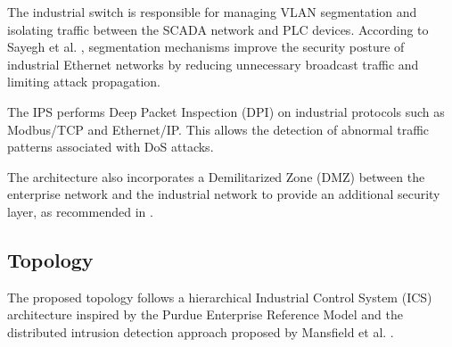 \documentclass[sigconf]{acmart}
\begin{document}
\begin{table}[htbp]
\renewcommand{\tablename}{Table} 
\renewcommand{\thetable}{\arabic{table}}
\captionsetup{labelsep=period, labelfont=bf, textfont=normal, textformat=simple} 
\caption{Components of the Proposed Industrial Architecture} 
\centering
\scriptsize
{}
\end{table}


The industrial switch is responsible for managing VLAN segmentation and isolating traffic between the SCADA network and PLC devices. According to Sayegh et al. \cite{sayegh2019ids}, segmentation mechanisms improve the security posture of industrial Ethernet networks by reducing unnecessary broadcast traffic and limiting attack propagation.

The IPS performs Deep Packet Inspection (DPI) on industrial protocols such as Modbus/TCP and Ethernet/IP. This allows the detection of abnormal traffic patterns associated with DoS attacks.

The architecture also incorporates a Demilitarized Zone (DMZ) between the enterprise network and the industrial network to provide an additional security layer, as recommended in \cite{ahmed2019survey}.

\subsection{Topology}
The proposed topology follows a hierarchical Industrial Control System (ICS) architecture inspired by the Purdue Enterprise Reference Model and the distributed intrusion detection approach proposed by Mansfield et al. \cite{mansfield2020threeTier}.
\end{document}
